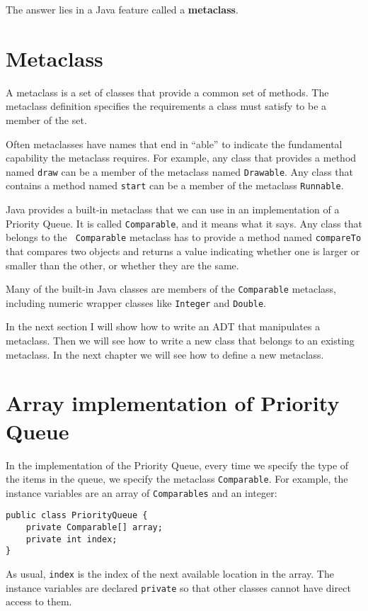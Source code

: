 The answer lies in a Java feature called a {\bf metaclass}.


\section {Metaclass}

A metaclass is a set of classes that provide a common set of methods.
The metaclass definition specifies the requirements a class must
satisfy to be a member of the set.

Often metaclasses have names that end in ``able'' to indicate
the fundamental capability the metaclass requires.  For
example, any class that provides a method named {\tt draw} can
be a member of the metaclass named {\tt Drawable}.  Any
class that contains a method named {\tt start} can be a member
of the metaclass {\tt Runnable}.

Java provides a built-in metaclass that we can use in an
implementation of a Priority Queue.  It is called {\tt Comparable},
and it means what it says.  Any class that belongs to the {\tt
Comparable} metaclass has to provide a method named {\tt compareTo}
that compares two objects and returns a value indicating whether one
is larger or smaller than the other, or whether they are the same.

Many of the built-in Java classes are members of the {\tt Comparable}
metaclass, including numeric wrapper classes like {\tt Integer}
and {\tt Double}.

In the next section I will show how to write an ADT that manipulates
a metaclass.  Then we will see how to write a new
class that belongs to an existing metaclass.  In the
next chapter we will see how to define a new metaclass.


\section{Array implementation of Priority Queue}

In the implementation of the Priority Queue, every time we specify
the type of the items in the queue, we specify the metaclass
{\tt Comparable}.  For example, the instance variables are an
array of {\tt Comparables} and an integer:

\begin{verbatim}
public class PriorityQueue {
    private Comparable[] array;
    private int index;
}
\end{verbatim}
%
As usual, {\tt index} is the index of the next available location in the
array.  The instance variables are declared {\tt private} so that
other classes cannot have direct access to them.

